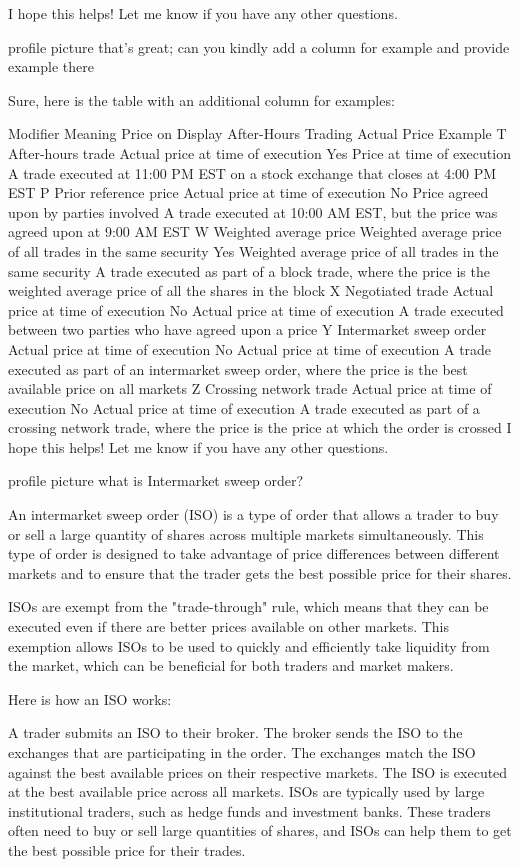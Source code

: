\documentclass[11pt]{article}
\begin{document}
I hope this helps! Let me know if you have any other questions.

profile picture
that's great; can you kindly add a column for example and provide example there 

Sure, here is the table with an additional column for examples:

Modifier	Meaning	Price on Display	After-Hours Trading	Actual Price	Example
T	After-hours trade	Actual price at time of execution	Yes	Price at time of execution	A trade executed at 11:00 PM EST on a stock exchange that closes at 4:00 PM EST
P	Prior reference price	Actual price at time of execution	No	Price agreed upon by parties involved	A trade executed at 10:00 AM EST, but the price was agreed upon at 9:00 AM EST
W	Weighted average price	Weighted average price of all trades in the same security	Yes	Weighted average price of all trades in the same security	A trade executed as part of a block trade, where the price is the weighted average price of all the shares in the block
X	Negotiated trade	Actual price at time of execution	No	Actual price at time of execution	A trade executed between two parties who have agreed upon a price
Y	Intermarket sweep order	Actual price at time of execution	No	Actual price at time of execution	A trade executed as part of an intermarket sweep order, where the price is the best available price on all markets
Z	Crossing network trade	Actual price at time of execution	No	Actual price at time of execution	A trade executed as part of a crossing network trade, where the price is the price at which the order is crossed
I hope this helps! Let me know if you have any other questions.

profile picture
what is Intermarket sweep order?

An intermarket sweep order (ISO) is a type of order that allows a trader to buy or sell a large quantity of shares across multiple markets simultaneously. This type of order is designed to take advantage of price differences between different markets and to ensure that the trader gets the best possible price for their shares.

ISOs are exempt from the "trade-through" rule, which means that they can be executed even if there are better prices available on other markets. This exemption allows ISOs to be used to quickly and efficiently take liquidity from the market, which can be beneficial for both traders and market makers.

Here is how an ISO works:

A trader submits an ISO to their broker.
The broker sends the ISO to the exchanges that are participating in the order.
The exchanges match the ISO against the best available prices on their respective markets.
The ISO is executed at the best available price across all markets.
ISOs are typically used by large institutional traders, such as hedge funds and investment banks. These traders often need to buy or sell large quantities of shares, and ISOs can help them to get the best possible price for their trades.
\end{document}
